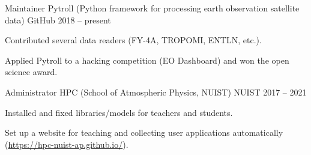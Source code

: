 

\begin{cventries}

  \cventry
    {Maintainer} %
    {Pytroll (Python framework for processing earth observation satellite data)} %
    {GitHub} %
    {2018 -- present} %
    {
      \begin{cvitems} %
        \item {Contributed several data readers (FY-4A, TROPOMI, ENTLN, etc.).}
        \item {Applied Pytroll to a hacking competition (EO Dashboard) and won the open science award.}
      \end{cvitems}
    }

  \cventry
    {Administrator} %
    {HPC (School of Atmospheric Physics, NUIST)} %
    {NUIST} %
    {2017 -- 2021} %
    {
      \begin{cvitems} %
        \item {Installed and fixed libraries/models for teachers and students.}
        \item {Set up a website for teaching and collecting user applications automatically (\hypersetup{hidelinks}\url{https://hpc-nuist-ap.github.io/}).}
      \end{cvitems}
    }

\end{cventries}
